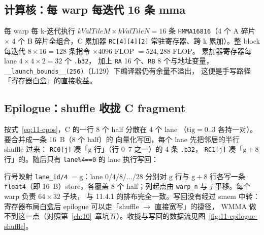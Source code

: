 \subsection{计算核：每 warp 每迭代 16 条 mma}



每 warp 每 k-迭代执行 $kValTileM \times kValTileN = 16$ 条
\texttt{HMMA16816}（4 个 A 碎片 $\times$ 4 个 B 碎片全组合，C 累加器
\texttt{RC[4][4][2]} 常驻寄存器、跨 k 累加）。整 block 每迭代
$8\times16 = 128$ 条指令 $\times 4096$ FLOP $= 524{,}288$ FLOP。
累加器寄存器每 lane $4\times4\times2 = 32$ 个 \texttt{.b32}，
加上 \texttt{RA} 16 个、\texttt{RB} 8 个与地址变量，
\texttt{\_\allowbreak{}\_\allowbreak{}launch\_\allowbreak{}bounds\_\allowbreak{}\_\allowbreak{}(256)}（L129）下编译器仍有余量不溢出，
这便是手写路径「寄存器白盒」的直接收益。

\subsection{Epilogue：shuffle 收拢 C fragment}



按式~\ref{eq:11-cpos}，C 的一行 8 个 half 分散在 4 个 lane
（$\mathrm{tig}=0..3$ 各持一对）。要合并成一条 16~B（8 个 half）的
向量化写回，每个 lane 先把邻居的半行 shuffle 过来：
\texttt{RC0[j]} 凑「$\mathrm{g}$ 行」（行 0--7 之一）的 4 条 \texttt{.b32}，
\texttt{RC1[j]} 凑「$\mathrm{g}{+}8$ 行」的。随后只有
\texttt{lane\%4==0} 的 lane 执行写回：



行号映射 \texttt{lane\_id/4} $= \mathrm{g}$：lane 0/4/8/.../28 分别对
$\mathrm{g}$ 行与 $\mathrm{g}{+}8$ 行各写一条
\texttt{float4}（即 16~B）store，各覆盖 8 个 half；列起点由
\texttt{warp\_n} 与 $j$ 平移。每个 warp 负责 $64\times32$ 子块，
与 11.4.1 的排布完全一致。写回没有经过 smem 中转：
寄存器布局白盒后 epilogue 可以走「shuffle $\to$ 直接宽写」的捷径，
WMMA 做不到这一点（对照第~\ref{ch:10}~章坑五）。收拢与写回的数据流见图~\ref{fig:11-epilogue-shuffle}。

